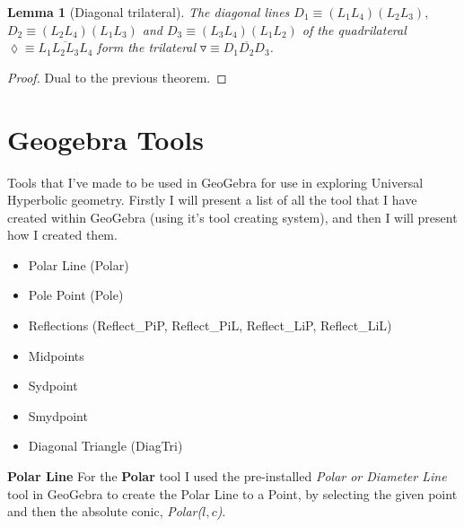 \documentclass[11pt]{article}
\newtheorem{theorem}{Theorem}
\newtheorem{theorem}{Lemma}
\begin{document}
\begin{theorem}[Diagonal trilateral]
The diagonal lines $D_{1}\equiv(L_{1}L_{4})(L_{2}L_{3}),$\newline
$D_{2}\equiv(L_{2}L_{4})(L_{1}L_{3})$ and $D_{3}%
\equiv(L_{3}L_{4})(L_{1}L_{2})$ of the quadrilateral $\lozenge\equiv%
\overline{L_{1}L_{2}L_{3}L_{4}}$ form the trilateral $\triangledown\equiv%
\overline{D_{1}D_{2}D_{3}}$.
\end{theorem}

\begin{proof}
Dual to the previous theorem.
\end{proof}

\pagebreak

\section{\protect\bigskip Geogebra Tools}

Tools that I've made to be used in GeoGebra for use in exploring Universal
Hyperbolic geometry. Firstly I will present a list of all the tool that I
have created within GeoGebra (using it's tool creating system), and then I
will present how I created them.\newline

\begin{itemize}
\item Polar Line (Polar)

\item Pole Point (Pole)

\item Reflections (Reflect\_PiP, Reflect\_PiL, Reflect\_LiP, Reflect\_LiL)

\item Midpoints

\item Sydpoint

\item Smydpoint

\item Diagonal Triangle (DiagTri)
\end{itemize}

\textbf{Polar Line}\newline
For the \textbf{Polar} tool I used the pre-installed \textit{Polar or
Diameter Line} tool in GeoGebra to create the Polar Line to a Point, by
selecting the given point and then the absolute conic, \textit{Polar($l,c$)}.%
\newline
{} %
\end{document}
